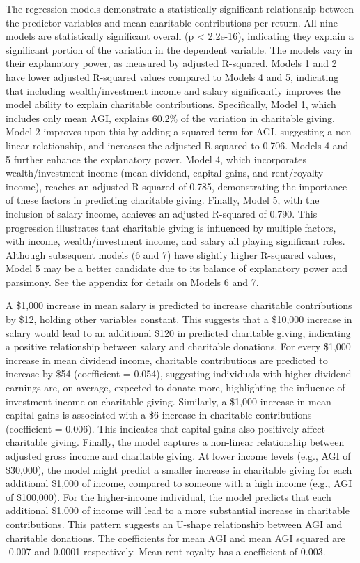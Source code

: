 \documentclass[
  letterpaper,
  DIV=11,
  numbers=noendperiod]{scrartcl}
\begin{document}
The regression models demonstrate a statistically significant
relationship between the predictor variables and mean charitable
contributions per return. All nine models are statistically significant
overall (p \textless{} 2.2e-16), indicating they explain a significant
portion of the variation in the dependent variable. The models vary in
their explanatory power, as measured by adjusted R-squared. Models 1 and
2 have lower adjusted R-squared values compared to Models 4 and 5,
indicating that including wealth/investment income and salary
significantly improves the model ability to explain charitable
contributions. Specifically, Model 1, which includes only mean AGI,
explains 60.2\% of the variation in charitable giving. Model 2 improves
upon this by adding a squared term for AGI, suggesting a non-linear
relationship, and increases the adjusted R-squared to 0.706. Models 4
and 5 further enhance the explanatory power. Model 4, which incorporates
wealth/investment income (mean dividend, capital gains, and rent/royalty
income), reaches an adjusted R-squared of 0.785, demonstrating the
importance of these factors in predicting charitable giving. Finally,
Model 5, with the inclusion of salary income, achieves an adjusted
R-squared of 0.790. This progression illustrates that charitable giving
is influenced by multiple factors, with income, wealth/investment
income, and salary all playing significant roles. Although subsequent
models (6 and 7) have slightly higher R-squared values, Model 5 may be a
better candidate due to its balance of explanatory power and parsimony.
See the appendix for details on Models 6 and 7.

A \$1,000 increase in mean salary is predicted to increase charitable
contributions by \$12, holding other variables constant. This suggests
that a \$10,000 increase in salary would lead to an additional \$120 in
predicted charitable giving, indicating a positive relationship between
salary and charitable donations. For every \$1,000 increase in mean
dividend income, charitable contributions are predicted to increase by
\$54 (coefficient = 0.054), suggesting individuals with higher dividend
earnings are, on average, expected to donate more, highlighting the
influence of investment income on charitable giving. Similarly, a
\$1,000 increase in mean capital gains is associated with a \$6 increase
in charitable contributions (coefficient = 0.006). This indicates that
capital gains also positively affect charitable giving. Finally, the
model captures a non-linear relationship between adjusted gross income
and charitable giving. At lower income levels (e.g., AGI of \$30,000),
the model might predict a smaller increase in charitable giving for each
additional \$1,000 of income, compared to someone with a high income
(e.g., AGI of \$100,000). For the higher-income individual, the model
predicts that each additional \$1,000 of income will lead to a more
substantial increase in charitable contributions. This pattern suggests
an U-shape relationship between AGI and charitable donations. The
coefficients for mean AGI and mean AGI squared are -0.007 and 0.0001
respectively. Mean rent royalty has a coefficient of 0.003.
\end{document}
